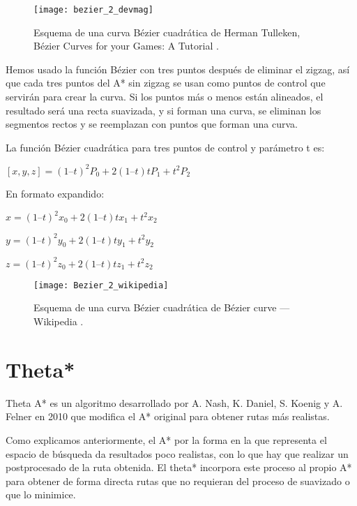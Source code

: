 \begin{figure}[htpb]
    \centering
    \texttt{[image: bezier\_2\_devmag]}
    \caption[Esquema de una curva Bézier cuadrática de Herman Tulleken]{Esquema de una curva Bézier cuadrática de Herman Tulleken, Bézier Curves for your Games: A Tutorial \cite{bezierdevmag_imagen}.}
    \label{fig:basics AFM sketch}
\end{figure}

Hemos usado la función Bézier con tres puntos después de eliminar el zigzag, así que cada tres puntos del A* sin zigzag se usan como puntos de control que servirán para crear la curva. Si los puntos más o menos están alineados, el resultado será una recta suavizada, y si forman una curva, se eliminan los segmentos rectos y se reemplazan con puntos que forman una curva. 

La función Bézier cuadrática para tres puntos de control y parámetro t es:

\begin{center}
$[x, y, z] = (1 – t)^2P_0 + 2(1 – t)tP_1 + t^2P_2$
\end{center}

En formato expandido:
\begin{center}
$x = (1 – t)^2x_0 + 2(1 – t)tx_1 + t^2x_2$

$y = (1 – t)^2y_0 + 2(1 – t)ty_1 + t^2y_2$

$z = (1 – t)^2z_0 + 2(1 – t)tz_1 + t^2z_2$
\end{center}

\begin{figure}[htpb]
    \centering
    \texttt{[image: Bezier\_2\_wikipedia]}
    \caption[Esquema de una curva Bézier cuadrática, Wikipedia]{Esquema de una curva Bézier cuadrática de Bézier curve --- Wikipedia \cite{wiki:bezierimagen}.}
    \label{fig:basics AFM sketch}
\end{figure}

\newpage

\section{Theta*} \label{referenciaTheta}
Theta A* es un algoritmo desarrollado por A. Nash, K. Daniel, S. Koenig y A. Felner \cite{thetaestrella, thetaestrellaweb} en 2010 que modifica el A* original para obtener rutas más realistas.

Como explicamos anteriormente, el A* por la forma en la que representa el espacio de búsqueda da resultados poco realistas, con lo que hay que realizar un postprocesado de la ruta obtenida. El theta* incorpora este proceso al propio A* para obtener de forma directa rutas que no requieran del proceso de suavizado o que lo minimice.

